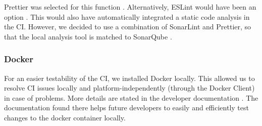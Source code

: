 Prettier was selected for this function \cite{dev}.
Alternatively, ESLint would have been an option \cite{eslint}.
This would also have automatically integrated a static code analysis in the CI.
However, we decided to use a combination of SonarLint and Prettier,
so that the local analysis tool is matched to SonarQube \cite{dev}.

\subsubsection{Docker}
For an easier testability of the CI, we installed Docker locally.
This allowed us to resolve CI issues locally and platform-independently (through the Docker Client) in case of problems.
More details are stated in the developer documentation \cite{dev}.
The documentation found there helps future developers to easily and efficiently test changes to the docker container locally. \\
